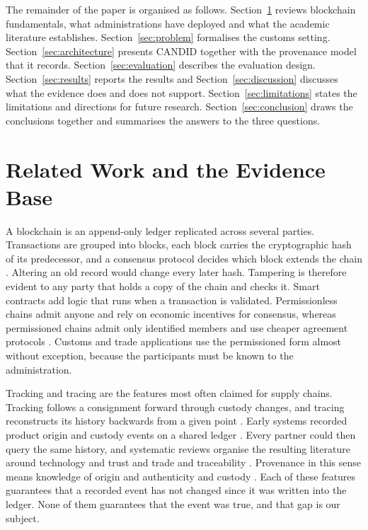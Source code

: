 \documentclass[information,article,submit,moreauthors]{Definitions/mdpi}
\begin{document}
The remainder of the paper is organised as follows. Section~\ref{sec:related} reviews blockchain fundamentals, what administrations have deployed and what the academic literature establishes. Section~\ref{sec:problem} formalises the customs setting. Section~\ref{sec:architecture} presents CANDID together with the provenance model that it records. Section~\ref{sec:evaluation} describes the evaluation design. Section~\ref{sec:results} reports the results and Section~\ref{sec:discussion} discusses what the evidence does and does not support. Section~\ref{sec:limitations} states the limitations and directions for future research. Section~\ref{sec:conclusion} draws the conclusions together and summarises the answers to the three questions.

\section{Related Work and the Evidence Base}\label{sec:related}

A blockchain is an append-only ledger replicated across several parties. Transactions are grouped into blocks, each block carries the cryptographic hash of its predecessor, and a consensus protocol decides which block extends the chain \cite{zheng2017overview}. Altering an old record would change every later hash. Tampering is therefore evident to any party that holds a copy of the chain and checks it. Smart contracts add logic that runs when a transaction is validated. Permissionless chains admit anyone and rely on economic incentives for consensus, whereas permissioned chains admit only identified members and use cheaper agreement protocols \cite{zheng2017overview,androulaki2018fabric}. Customs and trade applications use the permissioned form almost without exception, because the participants must be known to the administration.

Tracking and tracing are the features most often claimed for supply chains. Tracking follows a consignment forward through custody changes, and tracing reconstructs its history backwards from a given point \cite{sunny2020supply}. Early systems recorded product origin and custody events on a shared ledger \cite{lu2017adaptable,tian2016agrifood}. Every partner could then query the same history, and systematic reviews organise the resulting literature around technology and trust and trade and traceability \cite{pournader2020blockchain,casino2019systematic}. Provenance in this sense means knowledge of origin and authenticity and custody \cite{montecchi2019real}. Each of these features guarantees that a recorded event has not changed since it was written into the ledger. None of them guarantees that the event was true, and that gap is our subject.
\end{document}
